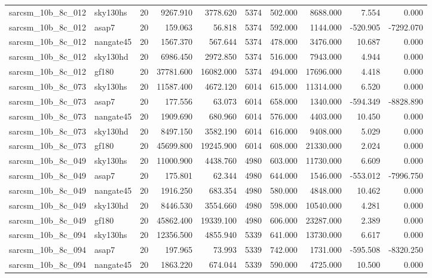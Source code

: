 \begin{tabular}{llrrrrrrrr}
sarcsm\_10b\_8c\_012 & sky130hs & 20 & 9267.910 & 3778.620 & 5374 & 502.000 & 8688.000 & 7.554 & 0.000 \\
sarcsm\_10b\_8c\_012 & asap7 & 20 & 159.063 & 56.818 & 5374 & 592.000 & 1144.000 & -520.905 & -7292.070 \\
sarcsm\_10b\_8c\_012 & nangate45 & 20 & 1567.370 & 567.644 & 5374 & 478.000 & 3476.000 & 10.687 & 0.000 \\
sarcsm\_10b\_8c\_012 & sky130hd & 20 & 6986.450 & 2972.850 & 5374 & 516.000 & 7943.000 & 4.944 & 0.000 \\
sarcsm\_10b\_8c\_012 & gf180 & 20 & 37781.600 & 16082.000 & 5374 & 494.000 & 17696.000 & 4.418 & 0.000 \\
sarcsm\_10b\_8c\_073 & sky130hs & 20 & 11587.400 & 4672.120 & 6014 & 615.000 & 11314.000 & 6.520 & 0.000 \\
sarcsm\_10b\_8c\_073 & asap7 & 20 & 177.556 & 63.073 & 6014 & 658.000 & 1340.000 & -594.349 & -8828.890 \\
sarcsm\_10b\_8c\_073 & nangate45 & 20 & 1909.690 & 680.960 & 6014 & 576.000 & 4403.000 & 10.450 & 0.000 \\
sarcsm\_10b\_8c\_073 & sky130hd & 20 & 8497.150 & 3582.190 & 6014 & 616.000 & 9408.000 & 5.029 & 0.000 \\
sarcsm\_10b\_8c\_073 & gf180 & 20 & 45699.800 & 19245.900 & 6014 & 608.000 & 21330.000 & 2.024 & 0.000 \\
sarcsm\_10b\_8c\_049 & sky130hs & 20 & 11000.900 & 4438.760 & 4980 & 603.000 & 11730.000 & 6.609 & 0.000 \\
sarcsm\_10b\_8c\_049 & asap7 & 20 & 175.801 & 62.344 & 4980 & 644.000 & 1546.000 & -553.012 & -7996.750 \\
sarcsm\_10b\_8c\_049 & nangate45 & 20 & 1916.250 & 683.354 & 4980 & 580.000 & 4848.000 & 10.462 & 0.000 \\
sarcsm\_10b\_8c\_049 & sky130hd & 20 & 8446.530 & 3554.660 & 4980 & 598.000 & 10540.000 & 4.281 & 0.000 \\
sarcsm\_10b\_8c\_049 & gf180 & 20 & 45862.400 & 19339.100 & 4980 & 606.000 & 23287.000 & 2.389 & 0.000 \\
sarcsm\_10b\_8c\_094 & sky130hs & 20 & 12356.500 & 4855.940 & 5339 & 641.000 & 13730.000 & 6.617 & 0.000 \\
sarcsm\_10b\_8c\_094 & asap7 & 20 & 197.965 & 73.993 & 5339 & 742.000 & 1731.000 & -595.508 & -8320.250 \\
sarcsm\_10b\_8c\_094 & nangate45 & 20 & 1863.220 & 674.044 & 5339 & 590.000 & 4725.000 & 10.500 & 0.000 \\

\end{tabular}
